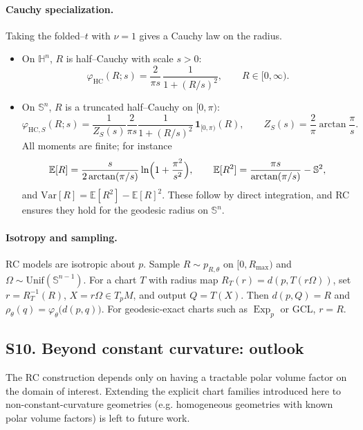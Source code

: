 \documentclass{article}
\theoremstyle{definition}
\theoremstyle{remark}
\newcommand{\SSS}{\mathbb{S}}
\newcommand{\HH}{\mathbb{H}}
\newcommand{\Exp}{\operatorname{Exp}}
\begin{document}
\paragraph{Cauchy specialization.}
Taking the folded--$t$ with $\nu=1$ gives a Cauchy law on the radius.

\begin{itemize}
\item On $\HH^n$, $R$ is half--Cauchy with scale $s>0$:
\[
\varphi_{\mathrm{HC}}(R;s)
=
\frac{2}{\pi s}\,\frac{1}{1+(R/s)^2},
\qquad R\in[0,\infty).
\]

\item On $\SSS^n$, $R$ is a truncated half--Cauchy on $[0,\pi)$:
\[
\varphi_{\mathrm{HC},S}(R;s)
=
\frac{1}{Z_S(s)}
\frac{2}{\pi s}
\frac{1}{1+(R/s)^2}\,\mathbf 1_{[0,\pi)}(R),
\qquad
Z_S(s)=\frac{2}{\pi}\arctan\frac{\pi}{s}.
\]
All moments are finite; for instance
\[
\mathbb E[R]
=
\frac{s}{2\arctan(\pi/s)}
\ln\Bigl(1+\frac{\pi^2}{s^2}\Bigr),\qquad
\mathbb E[R^2]
=
\frac{\pi s}{\arctan(\pi/s)}-\SSS^2,
\]
and $\mathrm{Var}[R]=\mathbb E[R^2]-\mathbb E[R]^2$.
These follow by direct integration, and RC ensures they hold for the geodesic radius on
$\SSS^n$.
\end{itemize}

\paragraph{Isotropy and sampling.}
RC models are isotropic about $p$. Sample $R\sim p_{R,\theta}$ on $[0,R_{\max})$
and $\Omega\sim\mathrm{Unif}(\SSS^{n-1})$. For a chart $T$ with radius map
$R_T(r)=d(p,T(r\Omega))$, set $r=R_T^{-1}(R)$, $X=r\Omega\in T_pM$, and output
$Q=T(X)$. Then $d(p,Q)=R$ and $\rho_\theta(q)=\varphi_\theta\bigl(d(p,q)\bigr)$.
For geodesic-exact charts such as $\Exp_p$ or GCL, $r=R$.

\subsection*{S10. Beyond constant curvature: outlook}
The RC construction depends only on having a tractable polar volume factor on
the domain of interest. Extending the explicit chart families introduced here
to non-constant-curvature geometries (e.g. homogeneous geometries with
known polar volume factors) is left to future work.


\clearpage
\end{document}
